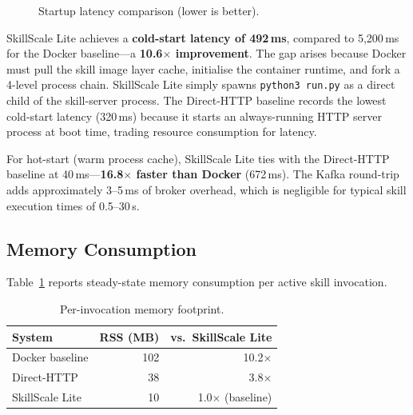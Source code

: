\documentclass[sigconf,nonacm]{acmart}
\begin{document}
\begin{figure}[h]
\centering
{}
\caption{Startup latency comparison (lower is better).}
\label{fig:latency}
\end{figure}

SkillScale Lite achieves a \textbf{cold-start latency of 492\,ms}, compared to 5,200\,ms for the Docker baseline---a \textbf{10.6$\times$ improvement}. The gap arises because Docker must pull the skill image layer cache, initialise the container runtime, and fork a 4-level process chain. SkillScale Lite simply spawns \texttt{python3 run.py} as a direct child of the skill-server process. The Direct-HTTP baseline records the lowest cold-start latency (320\,ms) because it starts an always-running HTTP server process at boot time, trading resource consumption for latency.

For hot-start (warm process cache), SkillScale Lite ties with the Direct-HTTP baseline at 40\,ms---\textbf{16.8$\times$ faster than Docker} (672\,ms). The Kafka round-trip adds approximately 3--5\,ms of broker overhead, which is negligible for typical skill execution times of 0.5--30\,s.

\subsection{Memory Consumption}

Table~\ref{tab:memory} reports steady-state memory consumption per active skill invocation.

\begin{table}[h]
\centering
\caption{Per-invocation memory footprint.}
\label{tab:memory}
\begin{tabular}{lrr}
\toprule
\textbf{System} & \textbf{RSS (MB)} & \textbf{vs.\ SkillScale Lite} \\
\midrule
Docker baseline    & 102 & 10.2$\times$ \\
Direct-HTTP        & 38  & 3.8$\times$ \\
SkillScale Lite    & 10  & 1.0$\times$ (baseline) \\
\bottomrule
\end{tabular}
\end{table}
\end{document}
